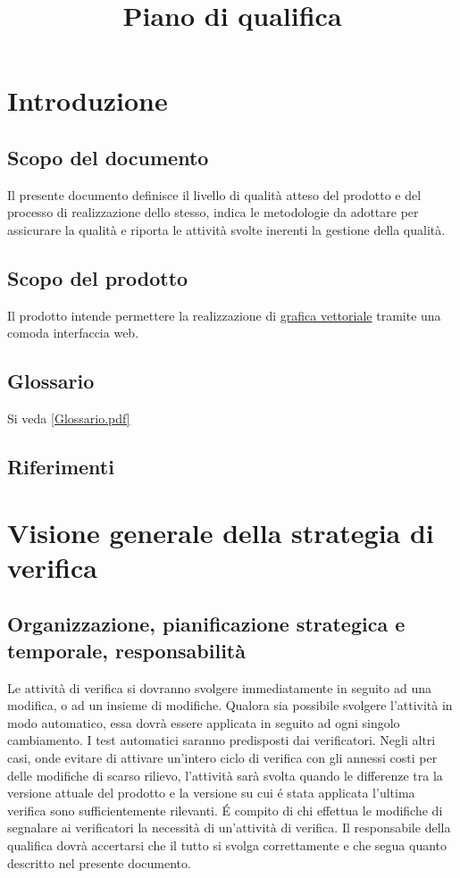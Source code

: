 \documentclass[a4paper]{article}
\begin{document}
\title{Piano di qualifica}


\section{Introduzione}

\subsection{Scopo del documento}
Il presente documento definisce il livello di qualit\`a atteso del prodotto e del processo di realizzazione dello stesso, indica le metodologie da adottare per assicurare la qualit\`a e riporta le attivit\`a svolte inerenti la gestione della qualit\`a.

\subsection{Scopo del prodotto}
Il prodotto intende permettere la realizzazione di \underline{grafica vettoriale} tramite una comoda interfaccia web.

\subsection{Glossario}
Si veda \ref{Glossario.pdf}

\subsection{Riferimenti}


\section{Visione generale della strategia di verifica}

\subsection{Organizzazione, pianificazione strategica e temporale, responsabilit\`a}
Le attivit\`a di verifica si dovranno svolgere immediatamente in seguito ad una modifica, o ad un insieme di modifiche. Qualora sia possibile svolgere l'attivit\`a in modo automatico, essa dovr\`a essere applicata in seguito ad ogni singolo cambiamento. I test automatici saranno predisposti dai verificatori. Negli altri casi, onde evitare di attivare un'intero ciclo di verifica con gli annessi costi per delle modifiche di scarso rilievo, l'attivit\`a sar\`a svolta quando le differenze tra la versione attuale del prodotto e la versione su cui \'e stata applicata l'ultima verifica sono sufficientemente rilevanti. \'E compito di chi effettua le modifiche di segnalare ai verificatori la necessit\`a di un'attivit\`a di verifica. Il responsabile della qualifica dovr\`a accertarsi che il tutto si svolga correttamente e che segua quanto descritto nel presente documento.
\end{document}
